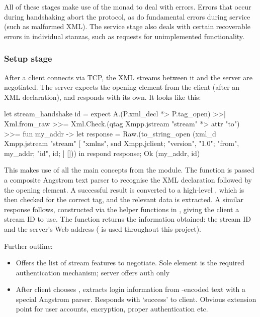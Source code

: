 \documentclass[12pt,a4paper,twoside,openright]{report}
\begin{document}
{All of these stages make use of the  monad to deal with errors. Errors that occur during handshaking abort the protocol, as do fundamental errors during service (such as malformed XML). The service stage also deals with certain recoverable errors in individual stanzas, such as requests for unimplemented functionality.

\subsubsection{Setup stage}\label{sec:server-setup}
After a client connects via TCP, the XML streams between it and the server are negotiated. The server expects the  opening element from the client (after an XML declaration), and responds with its own. It looks like this:

\begin{ocaml}
let stream_handshake id =
  expect A.(P.xml_decl *> P.tag_open) >>| Xml.from_raw >>=
    Xml.Check.(qtag Xmpp.jstream "stream" *> attr "to") >>= fun my_addr ->
  let response = Raw.(to_string_open (xml_d Xmpp.jstream "stream" [
    "xmlns", snd Xmpp.jclient;
    "version", "1.0"; "from", my_addr; "id", id;
  ] []))
  in respond response; Ok (my_addr, id)
\end{ocaml}

This makes use of all the main concepts from the  module. The  function is passed a composite Angstrom text parser to recognise the XML declaration followed by the opening  element. A successful result is converted to a high-level , which is then checked for the correct tag, and the relevant data is extracted. A similar response follows, constructed via the helper functions in , giving the client a stream ID to use. The function returns the information obtained: the stream ID and the server's Web address ( is used throughout this project).

Further outline:

\begin{itemize}
  \item Offers the list of stream features to negotiate. Sole element is the required authentication mechanism; server offers  auth only

  \item After client chooses , extracts login information from -encoded text with a special Angstrom parser. Responds with `success' to client. Obvious extension point for user accounts, encryption, proper authentication etc.


\end{itemize}}
\end{document}
